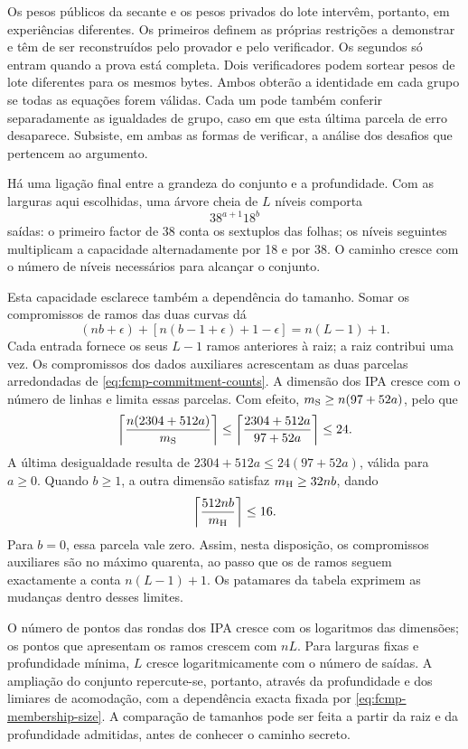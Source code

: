 Os pesos públicos da secante e os pesos privados do lote
intervêm, portanto, em experiências diferentes. Os primeiros
definem as próprias restrições a demonstrar e têm de ser
reconstruídos pelo provador e pelo verificador. Os segundos só
entram quando a prova está completa. Dois verificadores podem
sortear pesos de lote diferentes para os mesmos bytes. Ambos
obterão a identidade em cada grupo se todas as equações
forem válidas. Cada um pode também conferir separadamente as
igualdades de grupo, caso em que esta última parcela de erro
desaparece. Subsiste, em ambas as formas de verificar, a
análise dos desafios que pertencem ao argumento.

Há uma ligação final entre a grandeza do conjunto e a
profundidade. Com as larguras aqui escolhidas, uma árvore
cheia de \(L\) níveis comporta
\[
 38^{a+1}18^b
\]
saídas: o primeiro factor de 38 conta os sextuplos das
folhas; os níveis seguintes multiplicam a capacidade
alternadamente por 18 e por 38. O caminho cresce com
o número de níveis necessários para alcançar o conjunto.

Esta capacidade esclarece também a dependência do tamanho.
Somar os compromissos de ramos das duas curvas dá
\[
 (nb+\epsilon)+[n(b-1+\epsilon)+1-\epsilon]
       =n(L-1)+1.
\]
Cada entrada fornece os seus \(L-1\) ramos anteriores
à raiz; a raiz contribui uma vez. Os compromissos dos
dados auxiliares acrescentam as duas parcelas arredondadas
de \eqref{eq:fcmp-commitment-counts}. A dimensão dos IPA
cresce com o número de linhas e limita essas parcelas.
Com efeito, \(m_{\rm S}\geq n(97+52a)\), pelo que
\[
 \left\lceil\frac{n(2304+512a)}{m_{\rm S}}\right\rceil
 \leq
 \left\lceil\frac{2304+512a}{97+52a}\right\rceil
 \leq24.
\]
A última desigualdade resulta de
\(2304+512a\leq24(97+52a)\), válida para \(a\geq0\).
Quando \(b\geq1\), a outra dimensão satisfaz
\(m_{\rm H}\geq32nb\), dando
\[
 \left\lceil\frac{512nb}{m_{\rm H}}\right\rceil\leq16.
\]
Para \(b=0\), essa parcela vale zero. Assim, nesta
disposição, os compromissos auxiliares são no máximo
quarenta, ao passo que os de ramos seguem exactamente
a conta \(n(L-1)+1\). Os patamares da tabela exprimem
as mudanças dentro desses limites.

O número de pontos das rondas dos IPA cresce com os
logaritmos das dimensões; os pontos que apresentam os
ramos crescem com \(nL\). Para larguras fixas e profundidade
mínima, \(L\) cresce logaritmicamente com o número de
saídas. A ampliação do conjunto repercute-se, portanto,
através da profundidade e dos limiares de acomodação,
com a dependência exacta fixada por
\eqref{eq:fcmp-membership-size}. A comparação de tamanhos
pode ser feita a partir da raiz e da profundidade
admitidas, antes de conhecer o caminho secreto.

